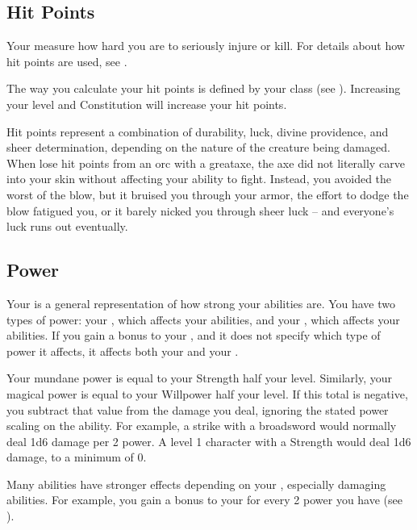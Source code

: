    \subsection{Hit Points}\label{Hit Points}
        Your  measure how hard you are to seriously injure or kill.
        For details about how hit points are used, see .

        The way you calculate your hit points is defined by your class (see ).
        Increasing your level and Constitution will increase your hit points.

         Hit points represent a combination of durability, luck, divine providence, and sheer determination, depending on the nature of the creature being damaged.
        When lose hit points from an orc with a greataxe, the axe did not literally carve into your skin without affecting your ability to fight.
        Instead, you avoided the worst of the blow, but it bruised you through your armor, the effort to dodge the blow fatigued you, or it barely nicked you through sheer luck -- and everyone's luck runs out eventually.

    \subsection{Power}\label{Power}
        Your  is a general representation of how strong your abilities are.
        You have two types of power: your , which affects your \magical abilities, and your , which affects your  abilities.
        If you gain a bonus to your , and it does not specify which type of power it affects, it affects both your  and your .

        Your mundane power is equal to your Strength \add half your level.
        Similarly, your magical power is equal to your Willpower \add half your level.
        If this total is negative, you subtract that value from the damage you deal, ignoring the stated power scaling on the ability.
        For example, a strike with a broadsword would normally deal 1d6 damage  per 2 power.
        A level 1 character with a  Strength would deal 1d6  damage, to a minimum of 0.

        Many abilities have stronger effects depending on your , especially damaging abilities.
        For example, you gain a  bonus to your  for every 2 power you have (see ).

